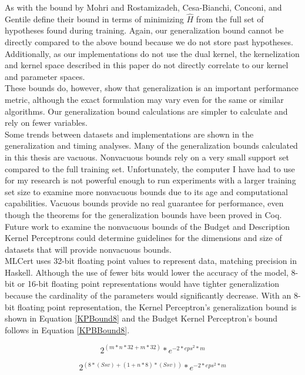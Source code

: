As with the bound by Mohri and Rostamizadeh, Cesa-Bianchi, Conconi, and Gentile define their bound in terms of minimizing $\hat{H}$ from the full set of hypotheses found during training. Again, our generalization bound cannot be directly compared to the above bound because we do not store past hypotheses. Additionally, as our implementations do not use the dual kernel, the kernelization and kernel space described in this paper do not directly correlate to our kernel and parameter spaces.
\\These bounds do, however, show that generalization is an important performance metric, although the exact formulation may vary even for the same or similar algorithms. Our generalization bound calculations are simpler to calculate and rely on fewer variables. 
\\Some trends between datasets and implementations are shown in the generalization and timing analyses. Many of the generalization bounds calculated in this thesis are vacuous. Nonvacuous bounds rely on a very small support set compared to the full training set. Unfortunately, the computer I have had to use for my research is not powerful enough to run experiments with a larger training set size to examine more nonvacuous bounds due to its age and computational capabilities. Vacuous bounds provide no real guarantee for performance, even though the theorems for the generalization bounds have been proved in Coq. Future work to examine the nonvacuous bounds of the Budget and Description Kernel Perceptrons could determine guidelines for the dimensions and size of datasets that will provide nonvacuous bounds.
\\MLCert uses 32-bit floating point values to represent data, matching precision in Haskell. Although the use of fewer bits would lower the accuracy of the model, 8-bit or 16-bit floating point representations would have tighter generalization because the cardinality of the parameters would significantly decrease. With an 8-bit floating point representation, the Kernel Perceptron's generalization bound is shown in Equation \ref{KPBound8} and the Budget Kernel Perceptron's bound follows in Equation \ref{KPBBound8}.

\begin{equation} \label{KPBound8}
 2^{(m*n*32 + m*32)} * e^{-2*eps^{2}*m}
\end{equation}

\begin{equation} \label{KPBBound8}
 2^{(8*(S sv) + (1 + n * 8)*(S sv))} * e^{-2*eps^{2}*m}
\end{equation}

